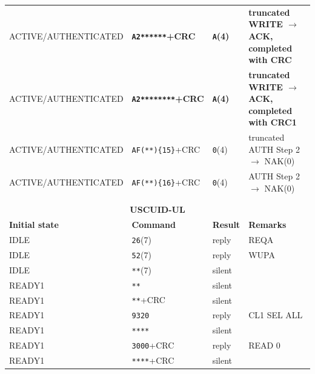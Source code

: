 \begin{longtable}{l l l l}
ACTIVE/AUTHENTICATED & \textbf{\texttt{A2******}+CRC}      & \textbf{\texttt{A}(4)}  & \textbf{truncated WRITE $\rightarrow$ ACK, completed with CRC}  \\
ACTIVE/AUTHENTICATED & \textbf{\texttt{A2********}+CRC}    & \textbf{\texttt{A}(4)}  & \textbf{truncated WRITE $\rightarrow$ ACK, completed with CRC1} \\
ACTIVE/AUTHENTICATED & \texttt{AF(**)\{15\}}+CRC           & \texttt{0}(4)           & truncated AUTH Step 2 $\rightarrow$ NAK(0) \\
ACTIVE/AUTHENTICATED & \texttt{AF(**)\{16\}}+CRC           & \texttt{0}(4)           & AUTH Step 2 $\rightarrow$ NAK(0) \\
\hline \\
\newpage
\multicolumn{4}{l}{}                                                                                     \\
\multicolumn{4}{c}{\textbf{USCUID-UL}}                                                                        \\
\hline
\textbf{Initial state} & \textbf{Command} & \textbf{Result} & \textbf{Remarks} \\
\hline
IDLE                 & \texttt{26}(7)                      & reply           & REQA                                        \\
IDLE                 & \texttt{52}(7)                      & reply           & WUPA                                        \\
IDLE                 & \texttt{**}(7)                      & silent          &                                             \\
READY1               & \texttt{**}                         & silent          &                                             \\
READY1               & \texttt{**}+CRC                     & silent          &                                             \\
READY1               & \texttt{9320}                       & reply           & CL1 SEL ALL                                 \\
READY1               & \texttt{****}                       & silent          &                                             \\
READY1               & \texttt{3000}+CRC                   & reply           & READ 0                                      \\
READY1               & \texttt{****}+CRC                   & silent          &                                             \\

\end{longtable}
